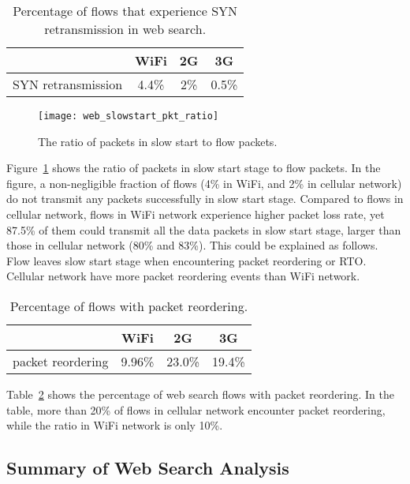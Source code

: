 \begin{table}[th]
\centering
\renewcommand{\arraystretch}{1.2}
\caption{Percentage of flows that experience SYN retransmission in web search.}
\label{tab:web_syn_retrans}
\begin{tabular}{l|c|c|c}
\toprule
& WiFi & 2G & 3G \\
\midrule
SYN retransmission & 4.4\% & 2\% & 0.5\% \\
\bottomrule
\end{tabular}
\end{table}

\begin{figure}[th]
\centering
\texttt{[image: web\_slowstart\_pkt\_ratio]}
\caption{The ratio of packets in slow start to flow packets.}
\label{fig:web_slowstart_ratio}
\end{figure}

Figure~\ref{fig:web_slowstart_ratio} shows the ratio of packets in slow start stage to flow packets. In the figure, a non-negligible fraction of flows (4\% in WiFi, and 2\% in cellular network) do not transmit any packets successfully in slow start stage. Compared to flows in cellular network, flows in WiFi network experience higher packet loss rate, yet 87.5\% of them could transmit all the data packets in slow start stage, larger than those in cellular network (80\% and 83\%). This could be explained as follows. Flow leaves slow start stage when encountering packet reordering or RTO. Cellular network have more packet reordering events than WiFi network.

\begin{table}[th]
\centering
\renewcommand{\arraystretch}{1.2}
\caption{Percentage of flows with packet reordering.}
\label{tab:web_reordering}
\begin{tabular}{l|c|c|c}
\toprule
& WiFi & 2G & 3G \\
\midrule
packet reordering & 9.96\% & 23.0\% & 19.4\% \\
\bottomrule
\end{tabular}
\end{table}

Table~\ref{tab:web_reordering} shows the percentage of web search flows with packet reordering. In the table, more than 20\% of flows in cellular network encounter packet reordering, while the ratio in WiFi network is only 10\%.

\subsection{Summary of Web Search Analysis}

